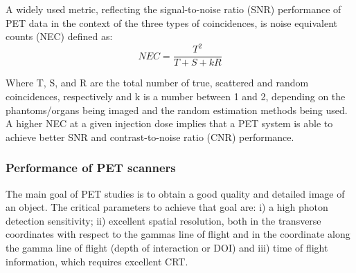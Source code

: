  A widely used
metric, reflecting the signal-to-noise ratio (SNR) performance of PET data in the context of
the three types of coincidences, is noise equivalent counts (NEC) defined as: 
%
\begin{equation}
NEC = \frac{T^2}{T+S+kR}
\label{eq.neq}
\end{equation}

Where T, S, and R are the total number of true, scattered and random coincidences,
respectively and k is a number between 1 and 2, depending on the phantoms/organs being imaged
and the random estimation methods being used. A higher NEC at a given injection dose
implies that a PET system is able to achieve better SNR and contrast-to-noise ratio (CNR)
performance.

\subsubsection*{Performance of PET scanners}

The main goal of PET studies is to obtain a good quality and detailed image of an object. The critical parameters to achieve that goal are: i) a high photon detection sensitivity; ii) excellent spatial resolution, both in the transverse coordinates with respect to the gammas line of flight and in the coordinate along the gamma line of flight (depth of interaction or DOI) and iii) time of flight information, which requires excellent CRT. 

